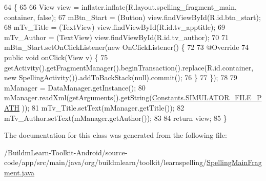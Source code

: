\begin{DoxyCode}
64                                                                                                       \{
65 
66         View view = inflater.inflate(R.layout.spelling\_fragment\_main, container, \textcolor{keyword}{false});
67         mBtn\_Start = (Button) view.findViewById(R.id.btn\_start);
68         mTv\_Title = (TextView) view.findViewById(R.id.tv\_apptitle);
69         mTv\_Author = (TextView) view.findViewById(R.id.tv\_author);
70 
71         mBtn\_Start.setOnClickListener(\textcolor{keyword}{new} OnClickListener() \{
72 
73             @Override
74             \textcolor{keyword}{public} \textcolor{keywordtype}{void} onClick(View v) \{
75                 getActivity().getFragmentManager().beginTransaction().replace(R.id.container, \textcolor{keyword}{new} 
      SpellingActivity()).addToBackStack(null).commit();
76             \}
77         \});
78 
79         mManager = DataManager.getInstance();
80         mManager.readXml(getArguments().getString(\hyperlink{classorg_1_1buildmlearn_1_1toolkit_1_1constant_1_1Constants_a5e8ea6ec23e727cbfc84e5b854ae311c}{Constants.SIMULATOR\_FILE\_PATH}
      ));
81         mTv\_Title.setText(mManager.getTitle());
82         mTv\_Author.setText(mManager.getAuthor());
83 
84         \textcolor{keywordflow}{return} view;
85     \}
\end{DoxyCode}


The documentation for this class was generated from the following file\-:\begin{DoxyCompactItemize}
\item 
/\-Buildm\-Learn-\/\-Toolkit-\/\-Android/source-\/code/app/src/main/java/org/buildmlearn/toolkit/learnspelling/\hyperlink{SpellingMainFragment_8java}{Spelling\-Main\-Fragment.\-java}\end{DoxyCompactItemize}
